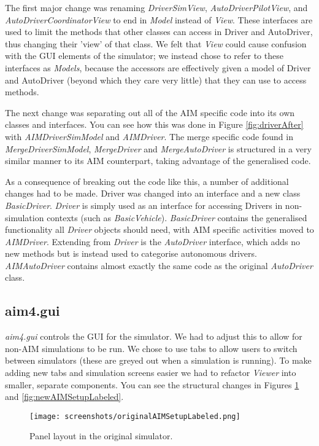 The first major change was renaming \emph{DriverSimView}, \emph{AutoDriverPilotView}, and \emph{AutoDriverCoordinatorView} to end in \emph{Model} instead of \emph{View}. These interfaces are used to limit the methods that other classes can access in Driver and AutoDriver, thus changing their 'view' of that class. We felt that \emph{View} could cause confusion with the GUI elements of the simulator; we instead chose to refer to these interfaces as \emph{Models}, because the accessors are effectively given a model of Driver and AutoDriver (beyond which they care very little) that they can use to access methods.

The next change was separating out all of the AIM specific code into its own classes and interfaces. You can see how this was done in Figure \ref{fig:driverAfter} with \emph{AIMDriverSimModel} and \emph{AIMDriver}. The merge specific code found in \emph{MergeDriverSimModel}, \emph{MergeDriver} and \emph{MergeAutoDriver} is structured in a very similar manner to its AIM counterpart, taking advantage of the generalised code.

As a consequence of breaking out the code like this, a number of additional changes had to be made. Driver was changed into an interface and a new class \emph{BasicDriver}. \emph{Driver} is simply used as an interface for accessing Drivers in non-simulation contexts (such as \emph{BasicVehicle}). \emph{BasicDriver} contains the generalised functionality all \emph{Driver} objects should need, with AIM specific activities moved to \emph{AIMDriver}. Extending from \emph{Driver} is the \emph{AutoDriver} interface, which adds no new methods but is instead used to categorise autonomous drivers. \emph{AIMAutoDriver} contains almost exactly the same code as the original \emph{AutoDriver} class.

\subsection{aim4.gui}
\label{subsec:aim4.gui}
\emph{aim4.gui} controls the GUI for the simulator. We had to adjust this to allow for non-AIM simulations to be run. We chose to use tabs to allow users to switch between simulators (these are greyed out when a simulation is running). To make adding new tabs and simulation screens easier we had to refactor \emph{Viewer} into smaller, separate components. You can see the structural changes in Figures \ref{fig:originalAIMSetupLabeled} and \ref{fig:newAIMSetupLabeled}.

\begin{figure}[htb]
\texttt{[image: screenshots/originalAIMSetupLabeled.png]}
\caption{Panel layout in the original simulator.}
\label{fig:originalAIMSetupLabeled}
\end{figure}

